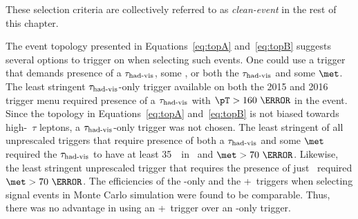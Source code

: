 These selection criteria are collectively referred to as {\it clean-event} in the rest of 
this chapter. 

\begin{table}[!h]
\centering
\caption{Signal region definition. Additionally, measures were taken to ensure that events originated 
from inelastic $pp$ collisions and no jets originated from unwanted experimental effects.}
\label{tab:sigReg}
\end{table}

\par The event topology presented in Equations~\ref{eq:topA} and~\ref{eq:topB} suggests several options 
to trigger on when selecting such events. One could use a trigger that demands presence of a $\tau_{\text{had-vis}}$, some \met, 
or both the $\tau_{\text{had-vis}}$ and some $\met$. The least stringent $\tau_{\text{had-vis}}$-only trigger available on both the 
2015 and 2016 trigger menu required presence of a $\tau_{\text{had-vis}}$ with $\pT>160~\GeV$ in the event. Since the topology 
in Equations~\ref{eq:topA} and~\ref{eq:topB} is not biased towards high-\pt\ $\tau$ leptons, a $\tau_{\text{had-vis}}$-only 
trigger was not chosen. The least stringent of all unprescaled triggers that require presence of both a $\tau_{\text{had-vis}}$ 
and some $\met$ required the $\tau_{\text{had-vis}}$ to have at least 35~\GeV\ in \pt\ and $\met>70~\GeV$. Likewise, the least stringent 
unprescaled trigger that requires the presence of just \met\ required $\met>70~\GeV$. The efficiencies of the \met-only and 
the \met+\tauvis\ triggers when selecting signal events in Monte Carlo simulation were found to be comparable. Thus, there was 
no advantage in using an \met+\tauvis\ trigger over an \met-only trigger. 

